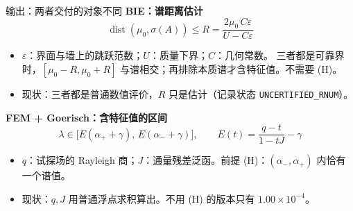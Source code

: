 \documentclass[aspectratio=169,11pt,fontset=fandol]{ctexbeamer}
\begin{document}
\begin{frame}{输出：两者交付的对象不同}
  \textbf{BIE：谱距离估计}
  \[
    \operatorname{dist}(\mu_0,\sigma(A))\le R=\frac{2\mu_0\,C\varepsilon}{U-C\varepsilon}
  \]
  \begin{itemize}\small
    \item $\varepsilon$：界面与墙上的跳跃范数；$U$：质量下界；$C$：几何常数。
      三者都是可靠界时，$[\mu_0-R,\mu_0+R]$ 与谱相交；再排除本质谱才含特征值。\alert{不需要 (H)}。
    \item 现状：三者都是普通数值评价，$R$ 只是\alert{估计}（记录状态 \texttt{UNCERTIFIED\_RNUM}）。
  \end{itemize}
  \vspace{0.3em}
  \textbf{FEM + Goerisch：含特征值的区间}
  \[
    \lambda\in\bigl[E(\alpha_++\gamma),\,E(\alpha_-+\gamma)\bigr],\qquad
    E(t)=\frac{q-t}{1-tJ}-\gamma
  \]
  \begin{itemize}\small
    \item $q$：试探场的 Rayleigh 商；$J$：通量残差泛函。前提 (H)：$(\alpha_-,\alpha_+)$ 内恰有一个谱值。
    \item 现状：$q,J$ 用普通浮点求积算出。不用 (H) 的版本只有 $1.00\times10^{-4}$。
  \end{itemize}
\end{frame}
\end{document}
